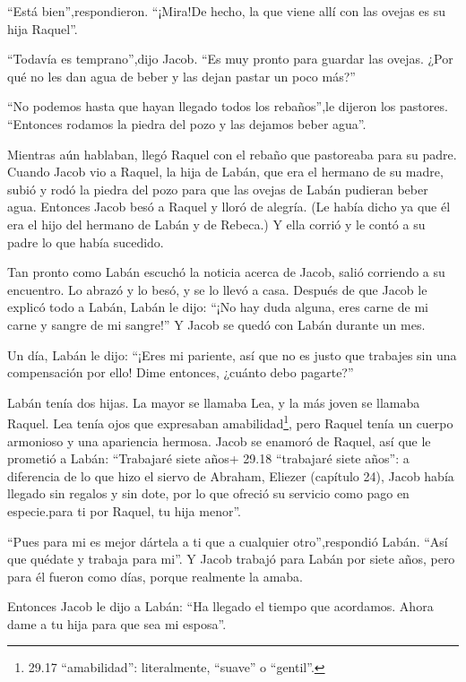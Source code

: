 ``Está bien'',respondieron. ``¡Mira!De hecho, la que viene allí con las
ovejas es su hija Raquel''.

 ``Todavía es temprano'',dijo Jacob. ``Es muy pronto para
guardar las ovejas. ¿Por qué no les dan agua de beber y las dejan pastar
un poco más?''

 ``No podemos hasta que hayan llegado todos los rebaños'',le
dijeron los pastores. ``Entonces rodamos la piedra del pozo y las
dejamos beber agua''.

 Mientras aún hablaban, llegó Raquel con el rebaño que
pastoreaba para su padre.  Cuando Jacob vio a Raquel, la
hija de Labán, que era el hermano de su madre, subió y rodó la piedra
del pozo para que las ovejas de Labán pudieran beber agua. 
Entonces Jacob besó a Raquel y lloró de alegría.  (Le había
dicho ya que él era el hijo del hermano de Labán y de Rebeca.) Y ella
corrió y le contó a su padre lo que había sucedido.

 Tan pronto como Labán escuchó la noticia acerca de Jacob,
salió corriendo a su encuentro. Lo abrazó y lo besó, y se lo llevó a
casa. Después de que Jacob le explicó todo a Labán,  Labán
le dijo: ``¡No hay duda alguna, eres carne de mi carne y sangre de mi
sangre!'' Y Jacob se quedó con Labán durante un mes.

 Un día, Labán le dijo: ``¡Eres mi pariente, así que no es
justo que trabajes sin una compensación por ello! Dime entonces, ¿cuánto
debo pagarte?''

 Labán tenía dos hijas. La mayor se llamaba Lea, y la más
joven se llamaba Raquel.  Lea tenía ojos que expresaban
amabilidad\footnote{29.17 ``amabilidad'': literalmente, ``suave'' o
  ``gentil''.}, pero Raquel tenía un cuerpo armonioso y una apariencia
hermosa.  Jacob se enamoró de Raquel, así que le prometió a
Labán: ``Trabajaré siete años+ 29.18 ``trabajaré siete años'': a
diferencia de lo que hizo el siervo de Abraham, Eliezer (capítulo 24),
Jacob había llegado sin regalos y sin dote, por lo que ofreció su
servicio como pago en especie.para ti por Raquel, tu hija menor''.

 ``Pues para mi es mejor dártela a ti que a cualquier
otro'',respondió Labán. ``Así que quédate y trabaja para mi''.
 Y Jacob trabajó para Labán por siete años, pero para él
fueron como días, porque realmente la amaba.

 Entonces Jacob le dijo a Labán: ``Ha llegado el tiempo que
acordamos. Ahora dame a tu hija para que sea mi esposa''.

